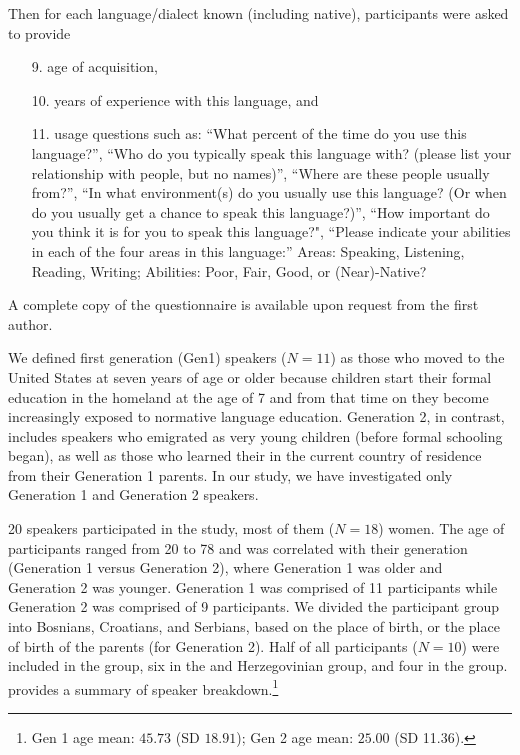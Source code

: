 \documentclass[output=paper,modfonts,newtxmath,hidelinks,]{langscibook}
\begin{document}
Then for each language/dialect known (including native), participants were asked to provide 

\begin{enumerate}
\item[9.] age of acquisition, 
\item[10.] years of experience with this language, and 
\item[11.] usage questions such as:          
  “What percent of the time do you use this language?”,    
  “Who do you typically speak this language with? (please list your     relationship with people, but no names)”, “Where are these people usually from?”,
  “In what environment(s) do you usually use this language? (Or when do     you usually get a chance to speak this language?)”,
  “How important do you think it is for you to speak this language?", 
  “Please indicate your abilities in each of the four areas in this language:” Areas: Speaking, Listening, Reading, Writing; Abilities: Poor, Fair, Good, or (Near)-Native?
\end{enumerate}

A complete copy of the questionnaire is available upon request from the first author.

We defined first generation (Gen1) speakers ($N=11$) as those who moved to the United States at seven years of age or older because children start their formal education in the homeland at the age of 7 and from that time on they become increasingly exposed to normative language education. Generation 2, in contrast, includes speakers who emigrated as very young children (before formal schooling began), as well as those who learned their  in the current country of residence from their Generation 1 parents. In our study, we have investigated only Generation 1 and Generation 2 speakers.



20 speakers participated in the study, most of them ($N=18$) women. The age of participants ranged from 20 to 78 and was correlated with their generation (Generation 1 versus Generation 2), where Generation 1 was older and Generation 2 was younger. Generation 1 was comprised of 11 participants while Generation 2 was comprised of 9 participants. We divided the participant group into Bosnians, Croatians, and Serbians, based on the place of birth, or the place of birth of the parents (for Generation 2). Half of all participants ($N=10$) were included in the  group, six in the  and {Herzegovinian} group, and four in the  group.  provides a summary of speaker breakdown.\footnote{Gen 1 age mean: $45.73$ (SD $18.91$); Gen 2 age mean: $25.00$ (SD 11.36).}
\end{document}
